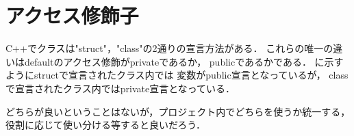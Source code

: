 
\section{アクセス修飾子}
C++でクラスは"struct"，"class"の2通りの宣言方法がある．
これらの唯一の違いはdefaultのアクセス修飾がprivateであるか，
publicであるかである．
に示すようにstructで宣言されたクラス内では
変数がpublic宣言となっているが，
classで宣言されたクラス内ではprivate宣言となっている．

どちらが良いということはないが，プロジェクト内でどちらを使うか統一する，役割に応じて使い分ける等すると良いだろう．



